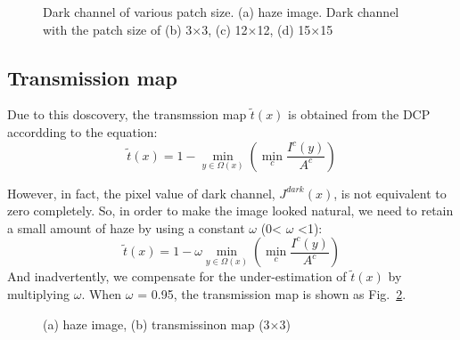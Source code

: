 \documentclass[10pt,twocolumn,letterpaper]{article}
\begin{document}
\begin{figure}[htbp]
 \caption{Dark channel of various patch size. (a) haze image. Dark channel with the patch size of (b) 3$\times$3, (c) 12$\times$12, (d) 15$\times$15}
\label{dark2}
\end{figure}

\subsection{Transmission map}
\par Due to this doscovery, the transmssion map $\tilde{t}(x) $ is obtained from the DCP accordding to the equation:
\begin{equation}
\tilde{t}(x)=1-\min\limits_{y\in\Omega(x)}(\min\limits_{c}\frac{I^{c}(y)}{A^c})
\end{equation}
\par However, in fact, the pixel value of dark channel, $J^{dark}(x)$, is not equivalent to zero completely. So, in order to make the image looked natural, we need to retain a small amount of haze by using a constant $\omega$ (0< $\omega$ <1):\begin{equation}
\tilde{t}(x)=1-\omega \min\limits_{y\in\Omega(x)}(\min\limits_{c}\frac{I^{c}(y)}{A^c})
\end{equation}
And inadvertently, we compensate for the under-estimation of $\tilde{t}(x)$ by multiplying $\omega$. When $\omega$ = 0.95, the transmission map is shown as Fig.~\ref{trans}.
 \begin{figure}[htbp]
 \centering{}
 \hfill
{}
 \caption{(a) haze image, (b) transmissinon map (3$\times$3)}
\label{trans}
\end{figure} 

 
 
\end{document}
